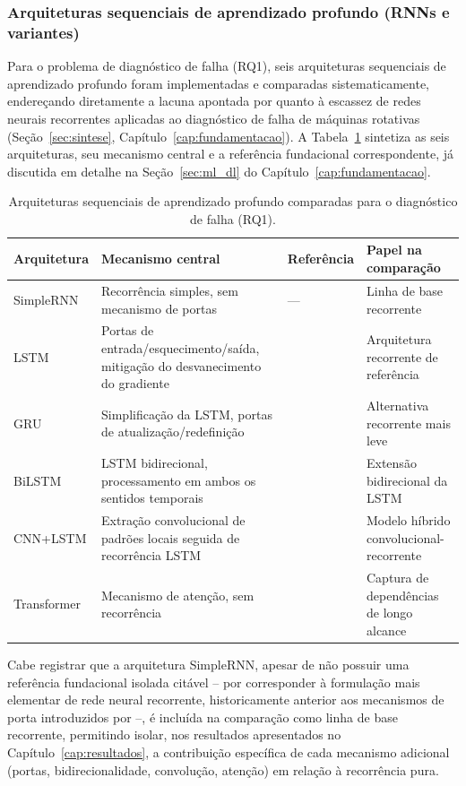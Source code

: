\documentclass[times,final]{elsarticle}
\begin{document}
\subsubsection{Arquiteturas sequenciais de aprendizado profundo (RNNs e variantes)}
\label{subsec:rnns}
Para o problema de diagnóstico de falha (RQ1), seis arquiteturas sequenciais de aprendizado profundo foram implementadas e comparadas sistematicamente, endereçando diretamente a lacuna apontada por \citet{hoang2019} quanto à escassez de redes neurais recorrentes aplicadas ao diagnóstico de falha de máquinas rotativas (Seção~\ref{sec:sintese}, Capítulo~\ref{cap:fundamentacao}). A Tabela~\ref{tab:arquiteturas} sintetiza as seis arquiteturas, seu mecanismo central e a referência fundacional correspondente, já discutida em detalhe na Seção~\ref{sec:ml_dl} do Capítulo~\ref{cap:fundamentacao}.
\begin{table}[htbp]
    \centering
    \caption{Arquiteturas sequenciais de aprendizado profundo comparadas para o diagnóstico de falha (RQ1).}
    \label{tab:arquiteturas}
    \begin{tabular}{@{}p{2.6cm}p{5.3cm}p{2.2cm}p{3cm}@{}}
        \toprule
        \textbf{Arquitetura} & \textbf{Mecanismo central} & \textbf{Referência} & \textbf{Papel na comparação} \\
        \midrule
        SimpleRNN & Recorrência simples, sem mecanismo de portas & --- & Linha de base recorrente \\
        LSTM & Portas de entrada/esquecimento/saída, mitigação do desvanecimento do gradiente & \citet{hochreiter1997} & Arquitetura recorrente de referência \\
        GRU & Simplificação da LSTM, portas de atualização/redefinição & \citet{cho2014} & Alternativa recorrente mais leve \\
        BiLSTM & LSTM bidirecional, processamento em ambos os sentidos temporais & \citet{hochreiter1997} & Extensão bidirecional da LSTM \\
        CNN+LSTM & Extração convolucional de padrões locais seguida de recorrência LSTM & \citet{hochreiter1997} & Modelo híbrido convolucional-recorrente \\
        Transformer & Mecanismo de atenção, sem recorrência & \citet{vaswani2017} & Captura de dependências de longo alcance \\
        \bottomrule
    \end{tabular}
\end{table}
Cabe registrar que a arquitetura SimpleRNN, apesar de não possuir uma referência fundacional isolada citável -- por corresponder à formulação mais elementar de rede neural recorrente, historicamente anterior aos mecanismos de porta introduzidos por \citet{hochreiter1997} --, é incluída na comparação como linha de base recorrente, permitindo isolar, nos resultados apresentados no Capítulo~\ref{cap:resultados}, a contribuição específica de cada mecanismo adicional (portas, bidirecionalidade, convolução, atenção) em relação à recorrência pura.
\end{document}
